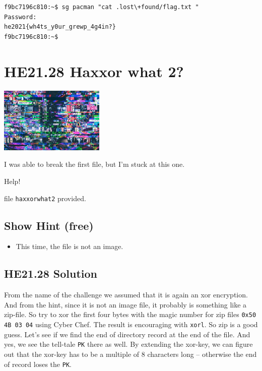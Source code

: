 \documentclass[english,a4paper,nols,noindent]{tufte-handout}
\begin{document}
\begin{verbatim} 
f9bc7196c810:~$ sg pacman "cat .lost\+found/flag.txt "
Password:
he2021{wh4ts_y0ur_grewp_4g4in?}
f9bc7196c810:~$
\end{verbatim} 

\hypertarget{he21.28}{%
  \section{HE21.28 Haxxor what 2?}
  \label{he21.28}}
\begin{marginfigure}
    \includegraphics[width=50mm]{images/challenge28.jpg}
\end{marginfigure}

\noindent I was able to break the first file, but I'm stuck at this one.

\noindent Help!

\noindent file \verb+haxxorwhat2+ provided.

\subsection{Show Hint (free)}
\begin{itemize}
\item This time, the file is not an image.
\end{itemize}

\hypertarget{he21.28-solution}{%
\subsection{HE21.28 Solution}\label{he21.28-solution}}

\noindent From the name of the challenge we assumed that it is again an xor
encryption.  And from the hint, since it is not an image file, it probably is
something like a zip-file.  So try to xor the first four bytes with the magic
number for zip files \verb+0x50 4B 03 04+ using Cyber Chef.  The result is
encouraging with \verb+xorl+.  So zip is a good guess.  Let's see if we find
the end of directory record at the end of the file.  And yes, we see the
tell-tale \verb+PK+ there as well.  By extending the xor-key, we can figure out
that the xor-key has to be a multiple of 8 characters long -- otherwise the end
of record loses the \verb+PK+.
\end{document}
